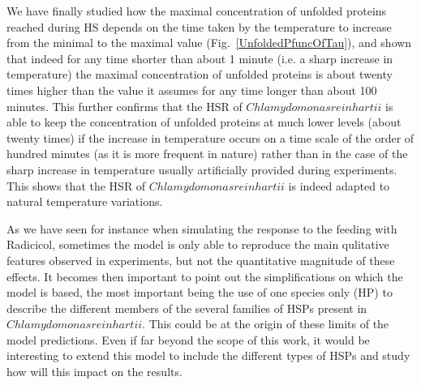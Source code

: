 \documentclass[oneside, 10pt, a4paper, twocolumn]{article}
\begin{document}
We have finally studied how the maximal concentration of unfolded proteins reached during HS depends on the time taken by the temperature to increase from the minimal to the maximal value (Fig.~\ref{UnfoldedPfuncOfTau}), and shown that indeed for any time shorter than about 1 minute (i.e. a sharp increase in temperature) the maximal concentration of unfolded proteins is about twenty times higher than the value it assumes for any time longer than about 100 minutes. This further confirms that the HSR of $Chlamydomonas reinhartii$ is able to keep the concentration of unfolded proteins at much lower levels (about twenty times) if the increase in temperature occurs on a time scale of the order of hundred minutes (as it is more frequent in nature) rather than in the case of the sharp increase in temperature usually artificially provided during experiments. %
This shows that the HSR of $Chlamydomonas reinhartii$ is indeed adapted to natural temperature variations.


As we have seen for instance when simulating the response to the feeding with Radicicol, sometimes the model is only able to reproduce the main qulitative features observed in experiments, but not the quantitative magnitude of these effects. It becomes then important to point out the simplifications on which the model is based, the most important being the use of one species only (HP) to describe the different members of the several families of HSPs present in $Chlamydomonas reinhartii$. This could be at the origin of these limits of the model predictions. Even if far beyond the scope of this work, it would be interesting to extend this model to include the different types of HSPs and study how will this impact on the results.
\end{document}

